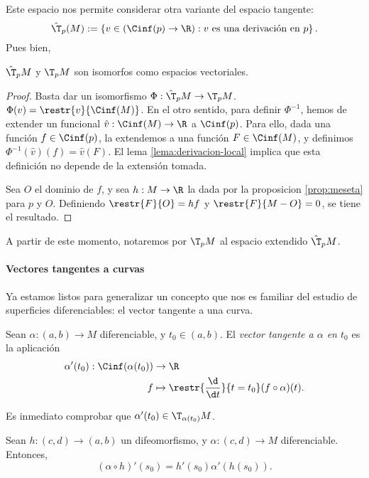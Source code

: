 Este espacio nos permite considerar otra variante del espacio tangente:
\[
  \hat{\T}_{p}(M) := \left\{ v\in(\Cinf(p)\to\R) :
        v\text{ es una derivación en $p$}
\right\}
.\]
Pues bien,
\begin{nth}
  $\hat{\T}_{p}M$ y $\T_{p}M$ son isomorfos como espacios vectoriales.
\end{nth}
\begin{proof}
  Basta dar un isomorfismo $\Phi:\hat{\T}_{p}M\to \T_{p}M$. $\Phi(v) =
  \restr{v}{\Cinf(M)}$. En el otro sentido, para definir $\Phi^{-1}$, hemos de
  extender un funcional $\hat{v}: \Cinf(M)\to\R$ a $\Cinf(p)$. Para ello, dada
  una función $f\in\Cinf(p)$, la extendemos a una función $F\in\Cinf(M)$, y
  definimos $\Phi^{-1}(\hat{v})(f) = \hat{v}(F)$. El lema
  \ref{lema:derivacion-local} implica que esta definición no depende de la
  extensión tomada.

  Sea $O$ el dominio de $f$, y sea $h:M\to\R$ la dada por la proposicion
  \ref{prop:meseta} para $p$ y $O$. Definiendo $\restr{F}{O} = hf$ y
  $\restr{F}{M-O} = 0$, se tiene el resultado.
\end{proof}
A partir de este momento, notaremos por $\T_{p}M$ al espacio extendido
$\hat{\T}_{p}M$.

\paragraph{Vectores tangentes a curvas}
Ya estamos listos para generalizar un concepto que nos es familiar del estudio
de superficies diferenciables: el vector tangente a una curva.
\begin{ndef} \label{def:diferencial-curva}
  Sean $\alpha:(a,b)\to M$ diferenciable, y $t_{0}\in(a,b)$. El \emph{vector
    tangente a $\alpha$ en $t_{0}$} es la aplicación
    \begin{alignat*}{2}
      \alpha'(t_{0}): \Cinf(\alpha(t_{0})) & \to \R \\
      f & \mapsto \restr{\frac{\d}{\d t}}{t = t_{0}}(f\circ\alpha)(t).
    \end{alignat*}
\end{ndef}
Es inmediato comprobar que $\alpha'(t_{0})\in \T_{\alpha(t_{0})}M$.

\begin{nprop}
  Sean $h:(c,d)\to(a,b)$ un difeomorfismo, y $\alpha:(c,d)\to M$
  diferenciable. Entonces,
  \[
    (\alpha\circ h)'(s_{0}) = h'(s_{0})\alpha'(h(s_{0}))
  .\]
\end{nprop}

